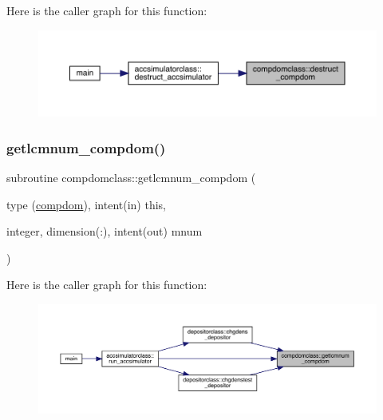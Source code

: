 Here is the caller graph for this function\+:\nopagebreak
\begin{figure}[H]
\begin{center}
\leavevmode
\includegraphics[width=350pt]{namespacecompdomclass_ae220a1544909bd8851faed61ce9ad7b8_icgraph}
\end{center}
\end{figure}
\mbox{\label{namespacecompdomclass_a545b0a4e8dce9ec9c326806ed1b36598}} 
\subsubsection{\texorpdfstring{getlcmnum\_compdom()}{getlcmnum\_compdom()}}
{\footnotesize\ttfamily subroutine compdomclass\+::getlcmnum\+\_\+compdom (\begin{DoxyParamCaption}\item[{type (\mbox{\hyperlink{namespacecompdomclass_structcompdomclass_1_1compdom}{compdom}}), intent(in)}]{this,  }\item[{integer, dimension(\+:), intent(out)}]{mnum }\end{DoxyParamCaption})}

Here is the caller graph for this function\+:\nopagebreak
\begin{figure}[H]
\begin{center}
\leavevmode
\includegraphics[width=350pt]{namespacecompdomclass_a545b0a4e8dce9ec9c326806ed1b36598_icgraph}
\end{center}
\end{figure}
\mbox{\label{namespacecompdomclass_ad0a907860c5bf17c263d8ad957c7ed1d}} 

